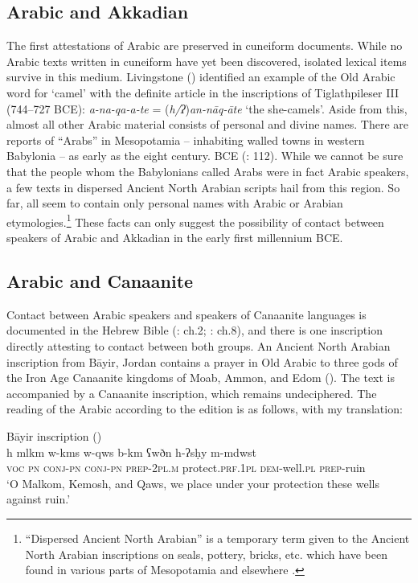 \documentclass[output=paper]{langsci/langscibook}
\begin{document}
\subsection{Arabic and Akkadian}
The first attestations of Arabic are preserved in cuneiform documents. While no Arabic texts written in cuneiform have yet been discovered, isolated lexical items survive in this medium. Livingstone (\citeyear{Livingstone1997}) identified an example of the Old Arabic word for `camel' with the definite article in the inscriptions of Tiglathpileser III (744--727 BCE): \textit{a-na-qa-a-te} = (\textit{h/ʔ})\textit{an-nāq-āte} ‘the she-camels’. Aside from this, almost all other Arabic material consists of personal and divine names. There are reports of “Arabs” in Mesopotamia – inhabiting walled towns in western Babylonia – as early as the eight century. BCE (\citealt{Ephal1974}: 112). While we cannot be sure that the people whom the Babylonians called Arabs were in fact Arabic speakers, a few texts in dispersed Ancient North Arabian scripts hail from this region. So far, all seem to contain only personal names with Arabic or Arabian etymologies.\footnote{``Dispersed Ancient North Arabian'' is a temporary term given to the Ancient North Arabian inscriptions on seals, pottery, bricks, etc. which have been found in various parts of Mesopotamia and elsewhere \citep[33]{Macdonald2000}.}  These facts can only suggest the possibility of contact between speakers of Arabic and Akkadian in the early first millennium BCE.

\subsection{Arabic and Canaanite}\label{Canaanite}
Contact between Arabic speakers and speakers of Canaanite languages is documented in the Hebrew Bible (\citealt{Ephal1982}: ch.2; \citealt{Retsö2003}: ch.8), and there is one inscription directly attesting to contact between both groups. An Ancient North Arabian inscription from Bāyir, Jordan contains a prayer in Old Arabic to three gods of the Iron Age Canaanite kingdoms of Moab, Ammon, and Edom (\citealt{Hayajnehetal2015}). The text is accompanied by a Canaanite inscription, which remains undeciphered. The reading of the Arabic according to the edition is as follows, with my translation:

\ea Bāyir inscription (\citealt{Hayajnehetal2015})\\
\gll h 	mlkm 	w-kms 	w-qws 	b-km 		   ʕwðn h-ʔsḥy 		m-mdwst	\\
     \textsc{voc} \textsc{pn} \textsc{conj-pn} \textsc{conj-pn} \textsc{prep-2pl.m} protect.\textsc{prf.1pl} \textsc{dem}-well.\textsc{pl} \textsc{prep}-ruin \\
\glt ‘O Malkom, Kemosh, and Qaws, we place under your protection these wells against ruin.’
\z
\end{document}
